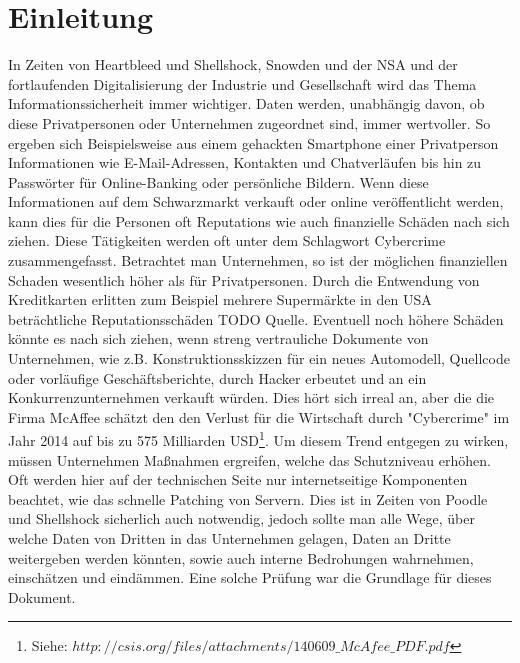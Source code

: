 \chapter{Einleitung}
In Zeiten von Heartbleed und Shellshock, Snowden und der NSA und der fortlaufenden Digitalisierung der Industrie und Gesellschaft wird das Thema Informationssicherheit immer wichtiger. Daten werden, unabhängig davon, ob diese Privatpersonen oder Unternehmen zugeordnet sind, immer wertvoller. So ergeben sich Beispielsweise aus einem gehackten Smartphone einer Privatperson Informationen wie E-Mail-Adressen, Kontakten und Chatverläufen bis hin zu Passwörter für Online-Banking oder persönliche Bildern. Wenn diese Informationen auf dem Schwarzmarkt verkauft oder online veröffentlicht werden, kann dies für die Personen oft Reputations wie auch finanzielle Schäden nach sich ziehen. Diese Tätigkeiten werden oft unter dem Schlagwort Cybercrime zusammengefasst. Betrachtet man Unternehmen, so ist der möglichen finanziellen Schaden wesentlich höher als für Privatpersonen. Durch die Entwendung von Kreditkarten erlitten zum Beispiel mehrere Supermärkte in den USA beträchtliche Reputationsschäden TODO Quelle. Eventuell noch höhere Schäden könnte es nach sich ziehen, wenn streng vertrauliche Dokumente von Unternehmen, wie z.B. Konstruktionsskizzen für ein neues Automodell, Quellcode oder vorläufige Geschäftsberichte, durch Hacker erbeutet und an ein Konkurrenzunternehmen verkauft würden. Dies hört sich irreal an, aber die die Firma McAffee schätzt den den Verlust für die Wirtschaft durch "Cybercrime" im Jahr 2014 auf bis zu 575 Milliarden USD\footnote{Siehe: $http://csis.org/files/attachments/140609\_McAfee\_PDF.pdf$}. 
Um diesem Trend entgegen zu wirken, müssen Unternehmen Maßnahmen ergreifen, welche das Schutzniveau erhöhen. Oft werden hier auf der technischen Seite nur internetseitige Komponenten beachtet, wie das schnelle Patching von Servern. Dies ist in Zeiten von Poodle und Shellshock sicherlich auch notwendig, jedoch sollte man alle Wege, über welche Daten von Dritten in das Unternehmen gelagen, Daten an Dritte weitergeben werden könnten, sowie auch interne Bedrohungen wahrnehmen, einschätzen und eindämmen. Eine solche Prüfung war die Grundlage für dieses Dokument.